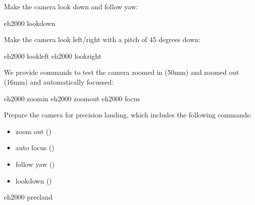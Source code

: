 \documentclass[letterpaper,10pt,english]{sphinxmanual}
\begin{document}
Make the camera look down and follow yaw:

\begin{sphinxVerbatim}[commandchars=\\\{\}]
eh2000  lookdown
\end{sphinxVerbatim}

Make the camera look left/right with a pitch of 45 degrees down:

\begin{sphinxVerbatim}[commandchars=\\\{\}]
eh2000  lookleft
eh2000  lookright
\end{sphinxVerbatim}

We provide commands to test the camera zoomed in (50mm) and zoomed out (16mm) and automatically focussed:

\begin{sphinxVerbatim}[commandchars=\\\{\}]
eh2000  zoomin
eh2000  zoomout
eh2000  focus
\end{sphinxVerbatim}

Prepare the camera for precision landing, which includes the following commands:
\begin{itemize}
\item {} 
zoom out ()

\item {} 
auto focus ()

\item {} 
follow yaw ()

\item {} 
lookdown ()

\end{itemize}

\begin{sphinxVerbatim}[commandchars=\\\{\}]
eh2000  precland
\end{sphinxVerbatim}
\end{document}
